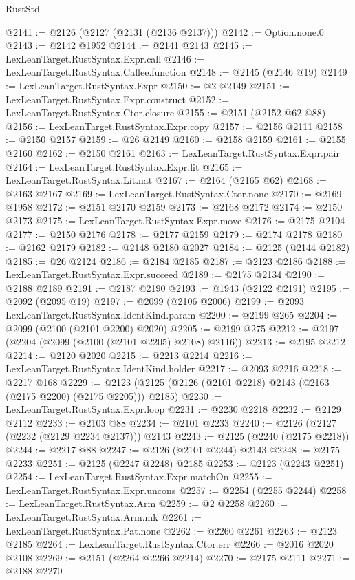 \begin{lexlean}{RustStd}
\begin{coremodule}
@2141 := @2126 (@2127 (@2131 (@2136 @2137)))
@2142 := Option.none.{0}
@2143 := @2142 @1952
@2144 := @2141 @2143
@2145 := LexLeanTarget.RustSyntax.Expr.call
@2146 := LexLeanTarget.RustSyntax.Callee.function
@2148 := @2145 (@2146 @19)
@2149 := LexLeanTarget.RustSyntax.Expr
@2150 := @2 @2149
@2151 := LexLeanTarget.RustSyntax.Expr.construct
@2152 := LexLeanTarget.RustSyntax.Ctor.closure
@2155 := @2151 (@2152 @62 @88)
@2156 := LexLeanTarget.RustSyntax.Expr.copy
@2157 := @2156 @2111
@2158 := @2150 @2157
@2159 := @26 @2149
@2160 := @2158 @2159
@2161 := @2155 @2160
@2162 := @2150 @2161
@2163 := LexLeanTarget.RustSyntax.Expr.pair
@2164 := LexLeanTarget.RustSyntax.Expr.lit
@2165 := LexLeanTarget.RustSyntax.Lit.nat
@2167 := @2164 (@2165 @62)
@2168 := @2163 @2167
@2169 := LexLeanTarget.RustSyntax.Ctor.none
@2170 := @2169 @1958
@2172 := @2151 @2170 @2159
@2173 := @2168 @2172
@2174 := @2150 @2173
@2175 := LexLeanTarget.RustSyntax.Expr.move
@2176 := @2175 @2104
@2177 := @2150 @2176
@2178 := @2177 @2159
@2179 := @2174 @2178
@2180 := @2162 @2179
@2182 := @2148 @2180 @2027
@2184 := @2125 (@2144 @2182)
@2185 := @26 @2124
@2186 := @2184 @2185
@2187 := @2123 @2186
@2188 := LexLeanTarget.RustSyntax.Expr.succeed
@2189 := @2175 @2134
@2190 := @2188 @2189
@2191 := @2187 @2190
@2193 := @1943 (@2122 @2191)
@2195 := @2092 (@2095 @19)
@2197 := @2099 (@2106 @2006)
@2199 := @2093 LexLeanTarget.RustSyntax.IdentKind.param
@2200 := @2199 @265
@2204 := @2099 (@2100 (@2101 @2200) @2020)
@2205 := @2199 @275
@2212 := @2197 (@2204 (@2099 (@2100 (@2101 @2205) @2108) @2116))
@2213 := @2195 @2212
@2214 := @2120 @2020
@2215 := @2213 @2214
@2216 := LexLeanTarget.RustSyntax.IdentKind.holder
@2217 := @2093 @2216
@2218 := @2217 @168
@2229 := @2123 (@2125 (@2126 (@2101 @2218) @2143 (@2163 (@2175 @2200) (@2175 @2205))) @2185)
@2230 := LexLeanTarget.RustSyntax.Expr.loop
@2231 := @2230 @2218
@2232 := @2129 @2112
@2233 := @2103 @88
@2234 := @2101 @2233
@2240 := @2126 (@2127 (@2232 (@2129 @2234 @2137))) @2143
@2243 := @2125 (@2240 (@2175 @2218))
@2244 := @2217 @88
@2247 := @2126 (@2101 @2244) @2143
@2248 := @2175 @2233
@2251 := @2125 (@2247 @2248) @2185
@2253 := @2123 (@2243 @2251)
@2254 := LexLeanTarget.RustSyntax.Expr.matchOn
@2255 := LexLeanTarget.RustSyntax.Expr.uncons
@2257 := @2254 (@2255 @2244)
@2258 := LexLeanTarget.RustSyntax.Arm
@2259 := @2 @2258
@2260 := LexLeanTarget.RustSyntax.Arm.mk
@2261 := LexLeanTarget.RustSyntax.Pat.none
@2262 := @2260 @2261
@2263 := @2123 @2185
@2264 := LexLeanTarget.RustSyntax.Ctor.err
@2266 := @2016 @2020 @2108
@2269 := @2151 (@2264 @2266 @2214)
@2270 := @2175 @2111
@2271 := @2188 @2270

\end{coremodule}
\end{lexlean}

